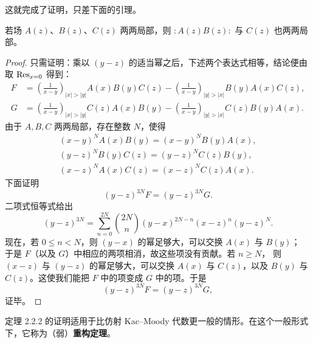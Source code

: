 这就完成了证明，只差下面的引理。

\renewcommand{\thelemma}{2.2.3}
\begin{lemma}[Dong]
    若场 $A(z)$、$B(z)$、$C(z)$ 两两局部，则
    $:\!A(z)B(z)\!:$ 与 $C(z)$ 也两两局部。
\end{lemma}

\begin{proof}
    只需证明：乘以 $(y-z)$ 的适当幂之后，下述两个表达式相等，结论便由取
    $\operatorname{Res}_{x=0}$ 得到：
    \[
        \begin{aligned}
            F&=\left(\frac{1}{x-y}\right)_{|x|>|y|}A(x)B(y)C(z)
            -\left(\frac{1}{x-y}\right)_{|y|>|x|}B(y)A(x)C(z),\\
            G&=\left(\frac{1}{x-y}\right)_{|x|>|y|}C(z)A(x)B(y)
            -\left(\frac{1}{x-y}\right)_{|y|>|x|}C(z)B(y)A(x).
        \end{aligned}
    \]
    由于 $A,B,C$ 两两局部，存在整数 $N$，使得
    \[
        \begin{gathered}
            (x-y)^NA(x)B(y)=(x-y)^NB(y)A(x),\\
            (y-z)^NB(y)C(z)=(y-z)^NC(z)B(y),\\
            (x-z)^NA(x)C(z)=(x-z)^NC(z)A(x).
        \end{gathered}
    \]
    下面证明
    \[
        (y-z)^{3N}F=(y-z)^{3N}G.
    \]
    二项式恒等式给出
    \[
        (y-z)^{3N}
        =\sum_{n=0}^{2N}\binom{2N}{n}(y-x)^{2N-n}(x-z)^n(y-z)^N.
    \]
    现在，若 $0\le n<N$，则 $(y-x)$ 的幂足够大，可以交换 $A(x)$ 与 $B(y)$；
    于是 $F$（以及 $G$）中相应的两项相消，故这些项没有贡献。若 $n\ge N$，
    则 $(x-z)$ 与 $(y-z)$ 的幂足够大，可以交换 $A(x)$ 与 $C(z)$，以及
    $B(y)$ 与 $C(z)$。这使我们能把 $F$ 中的项变成 $G$ 中的项。于是
    \[
        (y-z)^{3N}F=(y-z)^{3N}G,
    \]
    证毕。
\end{proof}

定理 2.2.2 的证明适用于比仿射 Kac--Moody 代数更一般的情形。在这个一般形式
下，它称为（弱）\textbf{重构定理}。

